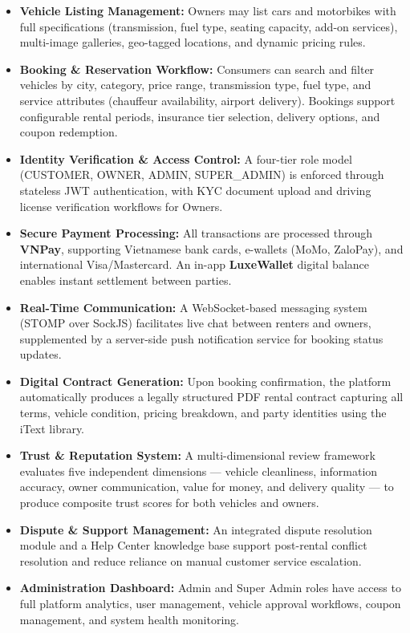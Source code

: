 \begin{itemize}
    \item \textbf{Vehicle Listing Management:} Owners may list cars and motorbikes with full specifications (transmission, fuel type, seating capacity, add-on services), multi-image galleries, geo-tagged locations, and dynamic pricing rules.

    \item \textbf{Booking \& Reservation Workflow:} Consumers can search and filter vehicles by city, category, price range, transmission type, fuel type, and service attributes (chauffeur availability, airport delivery). Bookings support configurable rental periods, insurance tier selection, delivery options, and coupon redemption.

    \item \textbf{Identity Verification \& Access Control:} A four-tier role model (CUSTOMER, OWNER, ADMIN, SUPER\_ADMIN) is enforced through stateless JWT authentication, with KYC document upload and driving license verification workflows for Owners.

    \item \textbf{Secure Payment Processing:} All transactions are processed through \textbf{VNPay}, supporting Vietnamese bank cards, e-wallets (MoMo, ZaloPay), and international Visa/Mastercard. An in-app \textbf{LuxeWallet} digital balance enables instant settlement between parties.

    \item \textbf{Real-Time Communication:} A WebSocket-based messaging system (STOMP over SockJS) facilitates live chat between renters and owners, supplemented by a server-side push notification service for booking status updates.

    \item \textbf{Digital Contract Generation:} Upon booking confirmation, the platform automatically produces a legally structured PDF rental contract capturing all terms, vehicle condition, pricing breakdown, and party identities using the iText library.

    \item \textbf{Trust \& Reputation System:} A multi-dimensional review framework evaluates five independent dimensions --- vehicle cleanliness, information accuracy, owner communication, value for money, and delivery quality --- to produce composite trust scores for both vehicles and owners.

    \item \textbf{Dispute \& Support Management:} An integrated dispute resolution module and a Help Center knowledge base support post-rental conflict resolution and reduce reliance on manual customer service escalation.

    \item \textbf{Administration Dashboard:} Admin and Super Admin roles have access to full platform analytics, user management, vehicle approval workflows, coupon management, and system health monitoring.
\end{itemize}

